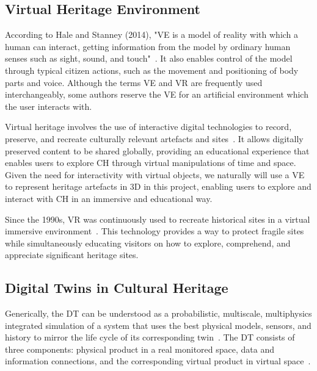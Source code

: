 \subsection{Virtual Heritage Environment}
\label{sec:virtual_heritage}

According to Hale and Stanney (2014), "\gls{VE} is a model of reality with which a human can interact, getting information 
from the model by ordinary human senses such as sight, sound, and touch"~\cite{hale2014handbook}. 
It also enables control of the model through typical citizen actions, such as the movement and positioning of body parts and voice. 
Although the terms \gls{VE} and \gls{VR} are frequently used interchangeably, some authors reserve the \gls{VE} for an artificial environment which the user interacts with.

Virtual heritage involves the use of interactive digital technologies to record, preserve, and recreate 
culturally relevant artefacts and sites~\cite{848434}. It allows digitally preserved content to be shared globally, providing an educational experience that enables users to explore \gls{CH} through virtual manipulations of time and space. 
Given the need for interactivity with virtual objects, we naturally will use a \gls{VE} to represent heritage artefacts 
in \gls{3D} in this project, enabling users to explore and interact with \gls{CH} in an immersive and educational way.

Since the 1990s, \gls{VR} was continuously used to recreate historical sites in a virtual immersive environment~\cite{hale2014handbook}. 
This technology provides a way to protect fragile sites while simultaneously educating visitors on how to explore, comprehend, and appreciate significant heritage sites.

\subsection{Digital Twins in Cultural Heritage}
\label{sec:digital_twin}


Generically, the \gls{DT} can be understood as a probabilistic, multiscale,
multiphysics integrated simulation of a system that uses the best physical models,
sensors, and history to mirror the life cycle of its corresponding twin~\cite{dezen2020towards}.
The \gls{DT} consists of three components: physical product in a real monitored
space, data and information connections, and the corresponding virtual product
in virtual space~\cite{grieves2017digital}.

